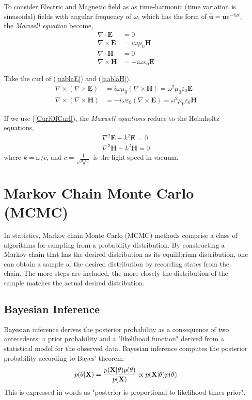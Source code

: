 To consider Electric and Magnetic field as as time-harmonic (time variation is sinusoidal) fields with angular frequency of $\omega$, which has the form of $\mathbf{\hat{u}} = \mathbf{u}e^{-i\omega t}$, the \textit{Maxwell equation} become,
\begin{align}
	\nabla\cdot\mathbf{E}  &= 0 \\
	\nabla\times\mathbf{E} &= i\omega\mu_0\mathbf{H} \label{nablaE}\\
	\nabla\cdot\mathbf{H}  &= 0 \\
	\nabla\times\mathbf{H} &= -i\omega\varepsilon_0\mathbf{E} \label{nablaH}
\end{align}

Take the curl of (\ref{nablaE}) and (\ref{nablaH}), 
\begin{align}
	\nabla\times(\nabla\times\mathbf{E}) &= i\omega\mu_0(\nabla\times\mathbf{H}) = \omega^2\mu_0\varepsilon_0\mathbf{E} \\
	\nabla\times(\nabla\times\mathbf{H}) &= -i\omega\varepsilon_0(\nabla\times\mathbf{E}) = \omega^2\mu_0\varepsilon_0\mathbf{H}
\end{align}

If we use (\ref{CurlOfCurl}), the \textit{Maxwell equations} reduce to the Helmholtz equations,
\begin{align}
	\nabla^2\mathbf{E} + k^2\mathbf{E} = 0 \\
	\nabla^2\mathbf{H} + k^2\mathbf{H} = 0
\end{align}
where $k = \omega/c$, and $c=\frac{1}{\sqrt{\mu_0\varepsilon_0}}$ is the light speed in vacuum. 


\section{Markov Chain Monte Carlo (MCMC)}
In statistics, Markov chain Monte Carlo (MCMC) methods comprise a class of algorithms for sampling from a probability distribution. By constructing a Markov chain that has the desired distribution as its equilibrium distribution, one can obtain a sample of the desired distribution by recording states from the chain. The more steps are included, the more closely the distribution of the sample matches the actual desired distribution. 

\subsection{Bayesian Inference}
Bayesian inference derives the posterior probability as a consequence of two antecedents: a prior probability and a "likelihood function" derived from a statistical model for the observed data. Bayesian inference computes the posterior probability according to Bayes' theorem:
\begin{equation}
	p(\theta|\mathbf{X}) = \frac{p(\mathbf{X}|\theta)p(\theta)}{p(\mathbf{X})} \propto p(\mathbf{X}|\theta)p(\theta)
\end{equation}
This is expressed in words as "posterior is proportional to likelihood times prior".

